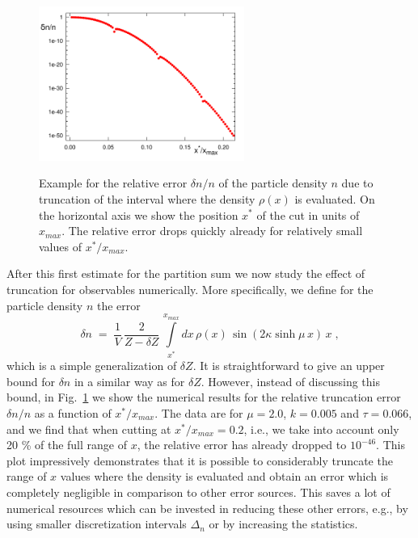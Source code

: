 \documentclass[a4paper,11pt]{article}
\begin{document}
\begin{figure}[t]
\centering
{\includegraphics[width=0.6\textwidth]{CuttingDoS.pdf}}
\caption{Example for the relative error $\delta n / n$ of the particle density $n$ due to truncation of 
the interval where the density $\rho(x)$ is evaluated. 
On the horizontal axis we show the position $x^*$ of the cut in units of $x_{max}$. The relative error drops
quickly already for relatively small values of $x^*/x_{max}$.}
\label{fig:cuttingDoS}
\end{figure}

After this first estimate for the partition sum we now study the effect of truncation for observables numerically.
More specifically, we define for the particle density $n$ the error
%
\begin{equation}
\delta n \;  = \;  \frac{1}{V} \, \frac{2}{Z-\delta Z} \, \int\limits_{x^*}^{x_{max}} \! \! dx \, \rho(x) \, \sin( 2 \kappa \sinh\! \mu \, x ) \, x  \; ,
\end{equation}
%
which is a simple generalization of $\delta Z$.
It is straightforward to give an upper bound for $\delta n$ in a similar way as for $\delta Z$. However, instead of 
discussing this bound, in Fig.~\ref{fig:cuttingDoS} we show the numerical results for the relative truncation error 
$\delta n / n$ as a function of $x^*/x_{max}$. The data are for $\mu=2.0$, $k=0.005$ and $\tau=0.066$, and we find 
that when cutting at $x^*/x_{max} = 0.2$, i.e., we take into account only 20 \% of the full range of $x$, the relative 
error has already dropped to $10^{-46}$. This plot impressively demonstrates that it is possible to considerably truncate 
the range of $x$ values where the density is evaluated and obtain an error which is completely negligible in comparison 
to other error sources. This saves a lot of numerical resources which can be invested in reducing these other
errors, e.g., by using smaller discretization intervals $\Delta_n$ or by increasing the statistics.
\end{document}

